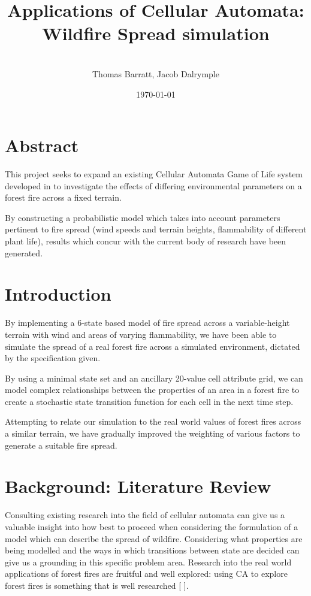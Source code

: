 \documentclass[11pt, a4paper, titlepage]{article}
\date{}
\title{ \textbf{Applications of Cellular Automata: Wildfire Spread simulation} \\  }
\author{\\ \Large{Thomas Barratt, Jacob Dalrymple  } }
\date{\today}
\begin{document}
\maketitle

\newpage

\section{Abstract}
This project seeks to expand an existing Cellular Automata Game of Life system developed in \cite{capyle_home_2016} to investigate the effects of differing environmental parameters on a forest fire across a fixed terrain.

By constructing a probabilistic model which takes into account parameters pertinent to fire spread (wind speeds and terrain heights, flammability of different plant life), results which concur with the current body of research have been generated.

\section{Introduction}
By implementing a 6-state based model of fire spread across a variable-height terrain with wind and areas of varying flammability, we have been able to simulate the spread of a real forest fire across a simulated environment, dictated by the specification given.

By using a minimal state set and an ancillary 20-value cell attribute grid, we can model complex relationships between the properties of an area in a forest fire to create a stochastic state transition function for each cell in the next time step.

Attempting to relate our simulation to the real world values of forest fires across a similar terrain, we have gradually improved the weighting of various factors to generate a suitable fire spread. 
\section{Background: Literature Review}
Consulting existing research into the field of cellular automata can give us a valuable insight into how best to proceed when considering the formulation of a model which can describe the spread of wildfire. Considering what properties are being modelled and the ways in which transitions between state are decided can give us a grounding in this specific problem area. Research into the real world applications of forest fires are fruitful and well explored: using CA to explore forest fires is something that is well researched [\cite{ntinas2017parallel}
\cite{clarke1994cellular}
\cite{trunfio2011new}].
\end{document}
